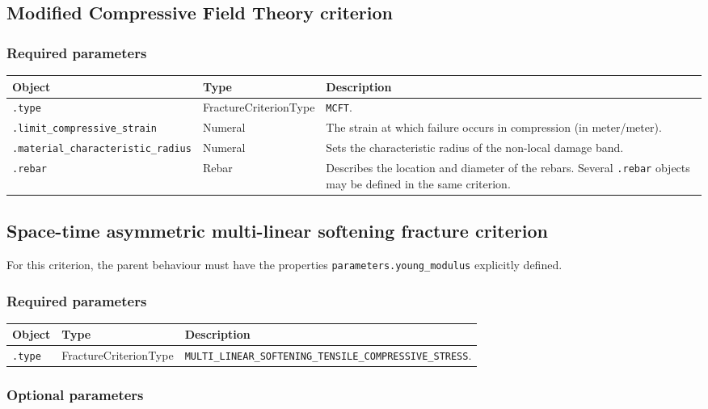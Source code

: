 \documentclass[10pt]{article}
\begin{document}
\subsection{Modified Compressive Field Theory criterion}

\subsubsection*{Required parameters}

\begin{tabularx}{\textwidth}{llX}
\hline 
Object & Type & Description \\ 
\hline 
\verb+.type+ & FractureCriterionType & \verb+MCFT+. \\ 
\verb+.limit_compressive_strain+ & Numeral & The strain at which failure occurs in compression (in meter/meter).\\
\verb+.material_characteristic_radius+ & Numeral & Sets the characteristic radius of the non-local damage band. \\ 
\verb+.rebar+ & Rebar & Describes the location and diameter of the rebars. Several \verb+.rebar+ objects may be defined in the same criterion.\\
\hline 
\end{tabularx}

\subsection{Space-time asymmetric multi-linear softening fracture criterion}

For this criterion, the parent behaviour must have the properties \verb+parameters.young_modulus+ explicitly defined.

\subsubsection*{Required parameters}

\begin{tabularx}{\textwidth}{llX}
\hline 
Object & Type & Description \\ 
\hline 
\verb+.type+ & FractureCriterionType & \verb+MULTI_LINEAR_SOFTENING_TENSILE_COMPRESSIVE_STRESS+. \\ 
\hline 
\end{tabularx}

\subsubsection*{Optional parameters}
\end{document}
